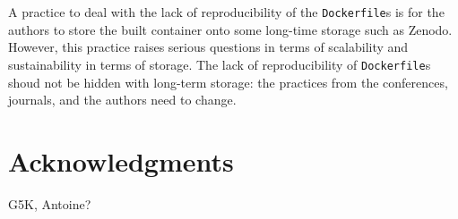 \documentclass[sigconf,natbib=false]{acmart}
\newcommand{\df}{\texttt{Dockerfile}}
\begin{document}
A practice to deal with the lack of reproducibility of the \df s is for the authors to store the built container onto some long-time storage such as Zenodo.
However, this practice raises serious questions in terms of scalability and sustainability in terms of storage.
The lack of reproducibility of \df s shoud not be hidden with long-term storage: the practices from the conferences, journals, and the authors need to change.

%

\section*{Acknowledgments}

G5K, Antoine?


\newpage
\newpage
%
%
\printbibliography
\end{document}
